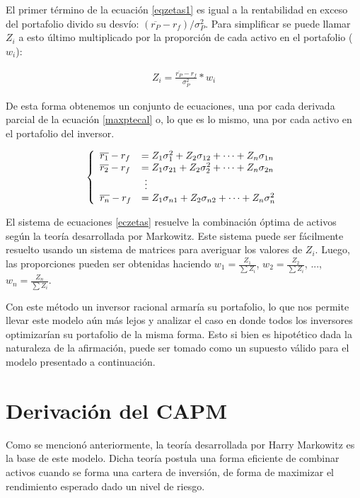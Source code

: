 El primer término de la ecuación \eqref{eqzetas1} es igual a la rentabilidad en exceso del portafolio divido su desvío: $ (\overline{r_P} - r_f)/\sigma_P^2$. Para simplificar se puede llamar $Z_i$ a esto último multiplicado por la proporción de cada activo en el portafolio ($w_i$):

\begin{align}
	Z_i = \frac{\overline{r_P} - r_f}{\sigma_P^2} * w_i \label{formulazeta}
\end{align}

De esta forma obtenemos un conjunto de ecuaciones, una por cada derivada parcial de la ecuación \eqref{maxptecal} o, lo que es lo mismo, una por cada activo en el portafolio del inversor.

\begin{align}
	\left\{
	\begin{array}{l l}
		\overline{r_1} - r_f &= Z_1 \sigma_1^2 + Z_2 \sigma_{1 2} + \dotsb + Z_n \sigma_{1 n} \\
		\overline{r_2} - r_f &= Z_1 \sigma_{2 1} + Z_2 \sigma_2^2 + \dotsb + Z_n \sigma_{2 n} \\
		& \mbox{ }\vdots \\
		\overline{r_n} - r_f &= Z_1 \sigma_{n 1} + Z_2 \sigma_{n 2} + \dotsb + Z_n \sigma_n^2 
	\end{array} \right. \label{eczetas}
\end{align}


El sistema de ecuaciones \eqref{eczetas} resuelve la combinación óptima de activos según la teoría desarrollada por Markowitz. Este sistema puede ser fácilmente resuelto usando un sistema de matrices para averiguar los valores de $Z_i$. Luego, las proporciones pueden ser obtenidas haciendo $w_1 = \frac{Z_1}{\sum Z_i}$, $w_2 = \frac{Z_2}{\sum Z_i}$, ..., $w_n = \frac{Z_n}{\sum Z_i}$.

Con este método un inversor racional armaría su portafolio, lo que nos permite llevar este modelo aún más lejos y analizar el caso en donde todos los inversores optimizarían su portafolio de la misma forma. Esto si bien es hipotético dada la naturaleza de la afirmación, puede ser tomado como un supuesto válido para el modelo presentado a continuación.

\section{Derivación del CAPM}

Como se mencionó anteriormente, la teoría desarrollada por Harry Markowitz es la base de este modelo. Dicha teoría postula una forma eficiente de combinar activos cuando se forma una cartera de inversión, de forma de maximizar el rendimiento esperado dado un nivel de riesgo.

